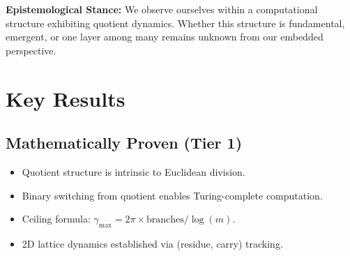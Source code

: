 \documentclass[11pt, a4paper]{article}
\newcommand{\cmark}{\ding{51}}%
\begin{document}
\textbf{Epistemological Stance:} We observe ourselves within a computational structure exhibiting quotient dynamics. Whether this structure is fundamental, emergent, or one layer among many remains unknown from our embedded perspective.

\section{Key Results}

\subsection{Mathematically Proven (Tier 1)}
\begin{itemize}
    \item[\cmark] Quotient structure is intrinsic to Euclidean division.
    \item[\cmark] Binary switching from quotient enables Turing-complete computation.
    \item[\cmark] Ceiling formula: $\gamma_{\max} = 2\pi \times \text{branches} / \log(m)$.
    \item[\cmark] 2D lattice dynamics established via (residue, carry) tracking.
\end{itemize}

\end{document}
